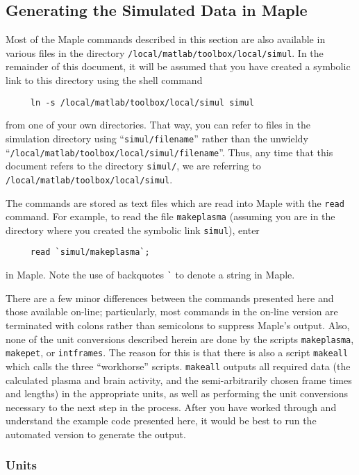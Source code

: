\subsection{Generating the Simulated Data in Maple}

Most of the Maple commands described in this section are also
available in various files in the directory
\verb|/local/matlab/toolbox/local/simul|.  In the remainder of this
document, it will be assumed that you have created a symbolic link to
this directory using the shell command
\begin{verbatim}
     ln -s /local/matlab/toolbox/local/simul simul
\end{verbatim}
from one of your own directories.  That way, you can refer to files in
the simulation directory using ``\verb|simul/filename|'' rather than
the unwieldy ``\verb|/local/matlab/toolbox/local/simul/filename|''.
Thus, any time that this document refers to the directory
\verb|simul/|, we are referring to \\
\verb|/local/matlab/toolbox/local/simul|.

The commands are stored as text files which are read into Maple with
the \verb|read| command.  For example, to read the file
\verb|makeplasma| (assuming you are in the directory where you created
the symbolic link \verb|simul|), enter 
\begin{verbatim}
     read `simul/makeplasma`;
\end{verbatim}
in Maple.  Note the use of backquotes \verb|`| to denote a string in Maple.

There are a few minor differences between the commands presented here
and those available on-line; particularly, most commands in the
on-line version are terminated with colons rather than semicolons to
suppress Maple's output.  Also, none of the unit conversions described
herein are done by the scripts \verb|makeplasma|, \verb|makepet|, or
\verb|intframes|.  The reason for this is that there is also a script 
\verb|makeall| which calls the three ``workhorse'' scripts.  
\verb|makeall| outputs all required data (the calculated plasma 
and brain activity, and the semi-arbitrarily chosen frame times and
lengths) in the appropriate units, as well as performing the unit
conversions necessary to the next step in the process.  After you have
worked through and understand the example code presented here, it
would be best to run the automated version to generate the output.

\subsubsection{Units}

